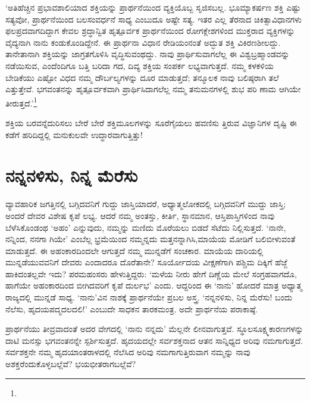 ‘ಅತಿಹೆಚ್ಚಿನ ಪ್ರಭಾವಶಾಲಿಯಾದ ಶಕ್ತಿಯನ್ನು ಪ್ರಾರ್ಥನೆಯಿಂದ ವ್ಯಕ್ತಿಯೊಬ್ಬ ಸೃಜಿಸಬಲ್ಲ. ಭೂಮ್ಯಾಕರ್ಷಣ ಶಕ್ತಿ ಎಷ್ಟು ಸತ್ಯವೋ, ಪ್ರಾರ್ಥನೆಯಿಂದ ಬಲಸಂವರ್ಧನೆ ಸಾಧ್ಯ ಎಂಬುದೂ ಅಷ್ಟೇ ಸತ್ಯ. ಇತರ ಎಲ್ಲ ತೆರನಾದ ಚಿಕಿತ್ಸಾವಿಧಾನಗಳು ಫಲಪ್ರದವಾಗದಿದ್ದಾಗ ಕೇವಲ ಶ್ರದ್ಧಾನ್ವಿತ ಹೃತ್ಪೂರ್ವಕ ಪ್ರಾರ್ಥನೆಯಿಂದ ರೋಗಕ್ಲೇಶಗಳಿಂದ ಮುಕ್ತರಾದ ವ್ಯಕ್ತಿಗಳನ್ನು ವೈದ್ಯನಾಗಿ ನಾನು ಕಂಡುಕೊಂಡಿದ್ದೇನೆ. ಈ ಪ್ರಾರ್ಥನಾ ವಿಧಾನ ರೇಡಿಯಂನಂತೆ ಅದ್ಭುತ ಶಕ್ತಿ ವಿಕಿರಣಶೀಲದ್ದು. ತಾನೇತಾನಾಗಿ ಶಕ್ತಿಯನ್ನು ಜಾಗ್ರತಗೊಳಿಸಿ ವೃದ್ಧಿಸುವಂಥದ್ದು. ನಾವು ಪ್ರಾರ್ಥಿಸುವಾಗಲೆಲ್ಲ ಈ ವಿಶ್ವಬ್ರಹ್ಮಾಂಡವನ್ನು ನಡೆಯಿಸುವ, ಎಂದೆಂದಿಗೂ ಬತ್ತಿ ಬರಿದಾ ಗದ, ದಿವ್ಯ ಶಕ್ತಿಯ ಸಂಪರ್ಕ ಲಭ್ಯವಾಗುತ್ತದೆ. ನಮ್ಮ ಕಳಕಳಿಯ ಬೇಡಿಕೆಯು ಎಷ್ಟೋ ವಿಧದ ನಮ್ಮ ದೌರ್ಬಲ್ಯಗಳನ್ನು ದೂರ ಮಾಡುತ್ತದೆ; ತನ್ಮೂಲಕ ನಾವು ಬಲಿಷ್ಠರಾಗಿ ತಲೆ ಎತ್ತುತ್ತೇವೆ. ಭಗವಂತನನ್ನು ಹೃತ್ಪೂರ್ವಕವಾಗಿ ಪ್ರಾರ್ಥಿಸಿದಾಗಲೆಲ್ಲ ನಮ್ಮ ತನುಮನಗಳಲ್ಲಿ ಶುಭ ಪರಿ ಣಾಮ ಆಗಿಯೇ ತೀರುತ್ತದೆ.’\footnote{\hfill{}}

ಶಕ್ತಿಯ ಬರವನ್ನೆದುರಿಸಲು ಬೇರೆ ಬೇರೆ ಶಕ್ತಿಮೂಲಗಳನ್ನು ಸೂರೆಗೈಯಲು ಹವಣಿಸು ತ್ತಿರುವ ವಿಜ್ಞಾನಿಗಳ ದೃಷ್ಟಿ ಈ ಕಡೆಗೆ ಹರಿದಿದ್ದಲ್ಲಿ ಮನುಕುಲವೇ ಉದ್ಧಾರವಾಗುತ್ತಿತ್ತು!


\section{ನನ್ನನಳಿಸು, ನಿನ್ನ ಮೆರೆಸು}

ವ್ಯಾವಹಾರಿಕ ಜಗತ್ತಿನಲ್ಲಿ ಬಗ್ಗಿದವನಿಗೆ ಗುದ್ದು ಜಾಸ್ತಿಯಾದರೆ, ಅಧ್ಯಾತ್ಮಲೋಕದಲ್ಲಿ ಬಗ್ಗಿದವನಿಗೆ ಮುದ್ದು ಜಾಸ್ತಿ; ಅಂದರೆ ದೇವರ ವಿಶೇಷ ಕೃಪೆ ಲಭ್ಯ. ಆದರೆ ನಮ್ಮ ಅಂತಸ್ತು, ಕೀರ್ತಿ, ಸ್ಥಾನಮಾನ, ಆಸ್ತಿಪಾಸ್ತಿಗಳಿಂದ ನಾವು ಬೆಳೆಸಿಕೊಂಡಂಥ ‘ಅಹಂ’ ಎನ್ನುವುದು, ನಮ್ಮನ್ನು ಮಣಿದು ಮೊರೆಯಲು ಬಿಡದೆ ಸೆಟೆದು ನಿಲ್ಲಿಸುತ್ತದೆ. ‘ನಾನೇ, ನನ್ನಿಂದ, ನನಗಾ ಗಿಯೇ’ ಎಂಬೆಲ್ಲ ಭ್ರಮೆಯಿಂದ ನಮ್ಮನ್ನದು ಮತ್ತನನ್ನಾಗಿಸಿ,ಮಾಯೆಯ ಮೋಡಿಗೆ ಬಲಿಬೀಳುವಂತೆ ಮಾಡುತ್ತದೆ. ಈ ಅಹಂಕಾರದಿಂದಲೇ ಆಗುತ್ತದೆ ನಮ್ಮ ಮುನ್ನಡೆಗೆ ಸಂಚಕಾರ. ಮಾಯೆಯ ದಾರಿಯಲ್ಲಿ ಮುನ್ನಡೆಯುವವನಿಗೆ ದೇವರು ಎಂದಾದರೂ ದೊರೆತಾನೇ? ಸೂರ್ಯೋದಯ ವೀಕ್ಷಣೆಗಾಗಿ ಪಶ್ಚಿಮ ದಿಕ್ಕಿಗೆ ಹೆಜ್ಜೆ ಹಾಕಿದಂತಲ್ಲವೇ ಇದು? ಪರಮಹಂಸರು ಹೇಳುತ್ತಿದ್ದರು: ‘ಮಳೆಯ ನೀರು ಹೇಗೆ ದಿಣ್ಣೆಯ ಮೇಲೆ ಸಂಗ್ರಹವಾಗದೊ, ಹಾಗೆಯೇ ಅಹಂಕಾರದಿಂದ ಬೀಗಿದವರಿಗೆ ಕೃಪೆ ದುರ್ಲಭ’ ಎಂದು. ಆದ್ದರಿಂದ ಈ ‘ನಾನು’ ಹೋದರೆ ಮಾತ್ರ ಅಧ್ಯಾತ್ಮ ರಾಜ್ಯದಲ್ಲಿ ಮುನ್ನಡೆ ಸಾಧ್ಯ. ‘ನಾನು’ವಿನ ನಾಶಕ್ಕೆ ಪ್ರಾರ್ಥನೆಯೇ ಪ್ರಬಲ ಅಸ್ತ್ರ. ‘ನನ್ನನಳಿಸು, ನಿನ್ನ ಮೆರೆಸು! ಬಂದು ನೆಲೆಸು, ಹೃದಯಪದ್ಮದಲದಲಿ!’ ಎಂಬುದೇ ಸಾಧಕನ ತಾರಕಮಂತ್ರ. ಅದೇ ಪ್ರಾರ್ಥನೆಯ ಪರಾಕಾಷ್ಠೆ.

ಪ್ರಾರ್ಥನೆಯು ತೀವ್ರವಾದಂತೆ ಅದರ ವೇಗದಲ್ಲಿ ‘ನಾನು ನನ್ನದು’ ಮೆಲ್ಲನೇ ಲೀನವಾಗುತ್ತವೆ. ಸ್ಥೂಲಸೂಕ್ಷ್ಮಕಾರಣಗಳನ್ನು ದಾಟಿ ಮನಸ್ಸು ಭಗವಂತನನ್ನೇ ಸ್ಪರ್ಶಿಸುತ್ತದೆ. ಹೃದಯದಲ್ಲೇ ಸರ್ವಶಕ್ತನಾದ ಆತನ ಸಾನ್ನಿಧ್ಯದ ಅರಿವು ನಮಗಾಗುತ್ತದೆ. ಸರ್ವಶಕ್ತನೇ ನಮ್ಮ ಹೃದಯಾಂತರಾಳದಲ್ಲಿ ನೆಲೆಸಿದ ಅರಿವು ನಮಗಾಗುತ್ತಿರುವಾಗ ನಮ್ಮನ್ನು ನಾವು ಅಶಕ್ತರೆಂದುಕೊಳ್ಳಬಲ್ಲೆವೆ? ಭಯಭೀತರಾಗಬಲ್ಲೆವೆ?

